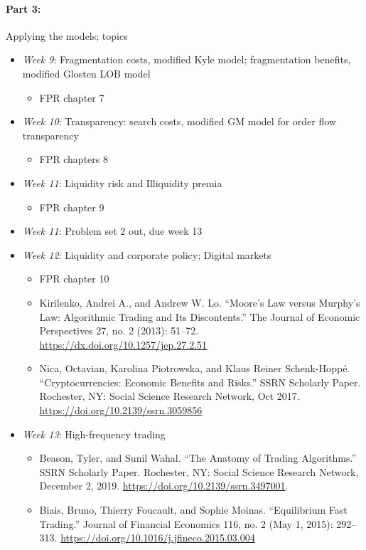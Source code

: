 \documentclass{article}
\begin{document}
\paragraph{Part 3:} Applying the models; topics
\begin{itemize}
	\item \textit{Week 9}: Fragmentation costs, {modified Kyle model}; fragmentation benefits, {modified Glosten LOB model}
	\begin{itemize}
		\item FPR chapter 7
	\end{itemize}
	\item \textit{Week 10}: Transparency: search costs, {modified GM model} for order flow transparency
	\begin{itemize}
		\item FPR chapters 8
	\end{itemize}
	\item \textit{Week 11}: Liquidity risk and Illiquidity premia
	\begin{itemize}
		\item FPR chapter 9
	\end{itemize}
	\item \textit{Week 11}: Problem set 2 out, due week 13
	\item \textit{Week 12}: Liquidity and corporate policy; Digital markets
	\begin{itemize}
		\item FPR chapter 10
		\item Kirilenko, Andrei A., and Andrew W. Lo. “Moore’s Law versus Murphy’s Law: Algorithmic Trading and Its Discontents.” The Journal of Economic Perspectives 27, no. 2 (2013): 51–72. \url{https://dx.doi.org/10.1257/jep.27.2.51}
		\item Nica, Octavian, Karolina Piotrowska, and Klaus Reiner Schenk-Hoppé. “Cryptocurrencies: Economic Benefits and Risks.” SSRN Scholarly Paper. Rochester, NY: Social Science Research Network, Oct 2017. \url{https://doi.org/10.2139/ssrn.3059856}
	\end{itemize}
	\item \textit{Week 13}: High-frequency trading
	\begin{itemize}
		\item Beason, Tyler, and Sunil Wahal. “The Anatomy of Trading Algorithms.” SSRN Scholarly Paper. Rochester, NY: Social Science Research Network, December 2, 2019. \url{https://doi.org/10.2139/ssrn.3497001}.
		\item Biais, Bruno, Thierry Foucault, and Sophie Moinas. “Equilibrium Fast Trading.” Journal of Financial Economics 116, no. 2 (May 1, 2015): 292–313. \url{https://doi.org/10.1016/j.jfineco.2015.03.004}

\end{itemize}
\end{itemize}
\end{document}
